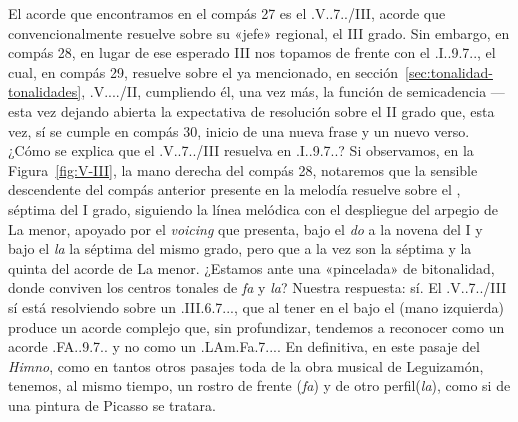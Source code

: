 El acorde que encontramos en el compás 27 es el \acorde.V..7../III, acorde que convencionalmente resuelve sobre su «jefe» regional, el III grado. Sin embargo, en compás 28, en lugar de ese esperado III nos topamos de frente con el \acorde.I..9.7.., el cual, en compás 29, resuelve sobre el ya mencionado, en sección~\ref{sec:tonalidad-tonalidades}, \acorde.V..../II, cumpliendo él, una vez más, la función de semicadencia ---esta vez dejando abierta la expectativa de resolución sobre el II grado que, esta vez, sí se cumple en compás 30, inicio de una nueva frase y un nuevo verso. ¿Cómo se explica que el \acorde.V..7../III resuelva en \acorde.I..9.7..? Si observamos, en la Figura~\ref{fig:V-III}, la mano derecha del compás 28, notaremos que la sensible descendente  del compás anterior presente en la melodía resuelve sobre el , séptima del I grado, siguiendo la línea melódica con el despliegue del arpegio de La menor, apoyado por el \emph{voicing} que presenta, bajo el \emph{do} a la novena del I y bajo el \emph{la} la séptima del mismo grado, pero que a la vez son la séptima y la quinta del acorde de La menor. ¿Estamos ante una «pincelada» de bitonalidad, donde conviven los centros tonales de \emph{fa} y \emph{la}? Nuestra respuesta: sí. El \acorde.V..7../III sí está resolviendo sobre un \acorde.III.6.7..., que al tener en el bajo el  (mano izquierda) produce un acorde complejo que, sin profundizar, tendemos a reconocer como un acorde \acorde.FA..9.7.. y no como un \acorde.LAm.Fa.7.... En definitiva, en este pasaje del \emph{Himno}, como en tantos otros pasajes toda de la obra musical de Leguizamón, tenemos, al mismo tiempo, un rostro de frente (\emph{fa}) y de otro perfil(\emph{la}), como si de una pintura de Picasso se tratara.
